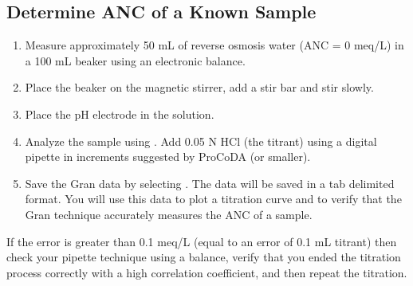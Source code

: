 \documentclass[letterpaper,10pt,english]{sphinxmanual}
\begin{document}
\subsection{Determine ANC of a Known Sample}
\label{\detokenize{Acid_Neutralizing_Capacity/Acid_Neutralizing_Capacity:determine-anc-of-a-known-sample}}\begin{enumerate}
\item {} 
Measure approximately 50 mL of reverse osmosis water (ANC = 0 meq/L) in a 100 mL beaker using an electronic balance.

\item {} 
Place the beaker on the magnetic stirrer, add a stir bar and stir slowly.

\item {} 
Place the pH electrode in the solution.

\item {} 
Analyze the sample using {\hyperref[\detokenize{ProCoDA/ProCoDA:heading-procoda-gran-plot}]{}}.  Add 0.05 N HCl (the titrant) using a digital pipette in increments suggested by ProCoDA (or smaller).

\item {} 
Save the Gran data by selecting . The data will be saved in a tab delimited format. You will use this data to plot a titration curve and to verify that the Gran technique accurately measures the ANC of a sample.

\end{enumerate}

If the error is greater than 0.1 meq/L (equal to an error of 0.1 mL titrant) then check your pipette technique using a balance, verify that you ended the titration process correctly with a high correlation coefficient, and then repeat the titration.
\end{document}
